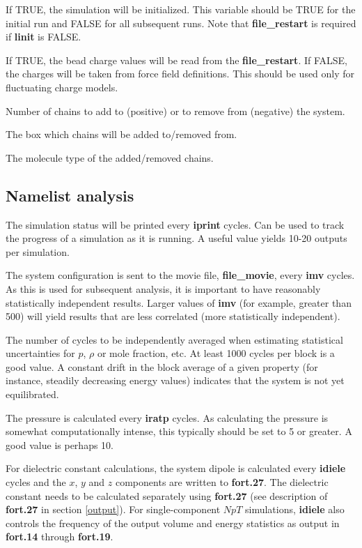 \documentclass[12pt,letterpaper]{article}
\begin{document}
 If TRUE, the simulation will be
initialized. This variable should be TRUE for the initial
run and FALSE for all subsequent runs. Note that {\bf
  file\_restart} is required if {\bf linit} is FALSE.

 If TRUE, the bead charge values will
be read from the {\bf file\_restart}. If FALSE, the charges
will be taken from force field definitions. This should be
used only for fluctuating charge models.

 Number of chains to add to (positive)
or to remove from (negative) the system.

 The box which chains will be
added to/removed from.

 The molecule type of the
added/removed chains.

\subsection{Namelist \textbf{analysis}}
 The simulation status will be printed
every {\bf iprint} cycles. Can be used to track the progress
of a simulation as it is running. A useful value yields
10-20 outputs per simulation.

 The system configuration is sent to the
movie file, {\bf file\_movie}, every {\bf imv} cycles. As
this is used for subsequent analysis, it is important to
have reasonably statistically independent results. Larger
values of {\bf imv} (for example, greater than 500) will
yield results that are less correlated (more statistically
independent).

 The number of cycles to be
independently averaged when estimating statistical
uncertainties for $p$, $\rho$ or mole fraction, etc. At
least 1000 cycles per block is a good value. A constant
drift in the block average of a given property (for
instance, steadily decreasing energy values) indicates that
the system is not yet equilibrated.

 The pressure is calculated every {\bf
  iratp} cycles. As calculating the pressure is somewhat
computationally intense, this typically should be set to 5
or greater. A good value is perhaps 10.

 For dielectric constant calculations,
the system dipole is calculated every {\bf idiele} cycles
and the $x$, $y$ and $z$ components are written to {\bf
  fort.27}. The dielectric constant needs to be calculated
separately using {\bf fort.27} (see description of {\bf
  fort.27} in section \ref{output}). For single-component
$NpT$ simulations, {\bf idiele} also controls the frequency
of the output volume and energy statistics as output in {\bf
  fort.14} through {\bf fort.19}.
\end{document}
